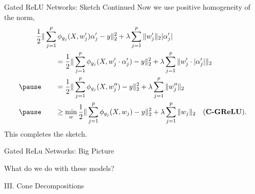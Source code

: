 \documentclass[usenames,dvipsnames,mathserif,notheorems]{beamer}
\begin{document}
\begin{frame}{Gated ReLU Networks: Sketch Continued}
	Now we use positive homogeneity of the norm,
	\[
		\begin{aligned}
			\half & \norm{\sum_{j=1}^p \phi_{g_j}(X, w'_{j})\alpha'_j - y}_2^2 + \lambda \sum_{j=1}^p \norm{w'_{j}}_2|\alpha'_j|                                     \\
			      & \quad \quad = \half \norm{\sum_{j=1}^p \phi_{g_j}(X, w'_{j}\cdot\alpha'_j) - y}_2^2 + \lambda \sum_{j=1}^p \norm{w'_{j} \cdot |\alpha'_j|}_2     \\ \pause
			      & \quad \quad = \half \norm{\sum_{j=1}^p \phi_{g_j}(X, w''_{j}) - y}_2^2 + \lambda \sum_{j=1}^p \norm{w''_{j}}_2                                   \\ \pause
			      & \quad \quad \geq \min_{w} \half \norm{\sum_{j=1}^p \phi_{g_j}(X, w_{j}) - y}_2^2 + \lambda \sum_{j=1}^p \norm{w_{j}}_2 \quad (\textbf{C-GReLU}).
		\end{aligned}
	\]
	This completes the sketch.
\end{frame}

\begin{frame}{Gated ReLu Networks: Big Picture}
	\begin{center}
		\Large What do we do with these models?
	\end{center}

	\pause

	\begin{figure}[]
		\centering
		
	\end{figure}
\end{frame}


\begin{frame}{}
	\begin{center}
		\huge III. Cone Decompositions
	\end{center}
\end{frame}
\end{document}
